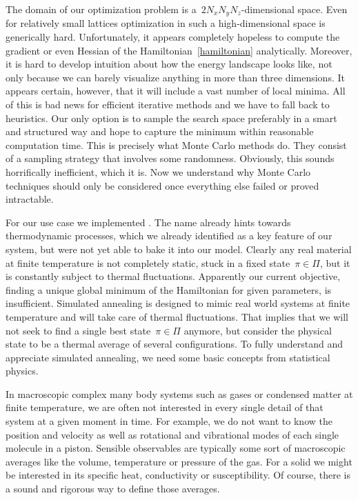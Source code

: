 The domain of our optimization problem is a~$2 N_x N_y N_z$-dimensional space.
Even for relatively small lattices optimization in such a high-dimensional space
is generically hard. Unfortunately, it appears completely hopeless to compute
the gradient or even Hessian of the Hamiltonian~\eqref{hamiltonian}
analytically. Moreover, it is hard to develop intuition about how the energy
landscape looks like, not only because we can barely visualize anything in more
than three dimensions. It appears certain, however, that it will include a vast
number of local minima. All of this is bad news for efficient iterative methods
and we have to fall back to heuristics. Our only option is to sample the search
space preferably in a smart and structured way and hope to capture the minimum
within reasonable computation time. This is precisely what Monte Carlo methods
do. They consist of a sampling strategy that involves some randomness.
Obviously, this sounds horrifically inefficient, which it is. Now we understand
why Monte Carlo techniques should only be considered once everything else failed
or proved intractable.

For our use case we implemented . The name already
hints towards thermodynamic processes, which we already identified as a key
feature of our system, but were not yet able to bake it into our model. Clearly
any real material at finite temperature is not completely static, \ie{} stuck in
a fixed state~$\pi \in \Pi$, but it is constantly subject to thermal
fluctuations. Apparently our current objective, finding a unique global minimum
of the Hamiltonian for given parameters, is insufficient. Simulated annealing is
designed to mimic real world systems at finite temperature and will take care of
thermal fluctuations. That implies that we will not seek to find a single best
state~$\pi \in \Pi$ anymore, but consider the physical state to be a thermal
average of several configurations. To fully understand and appreciate simulated
annealing, we need some basic concepts from statistical physics.

In macroscopic complex many body systems such as gases or condensed matter at
finite temperature, we are often not interested in every single detail of that
system at a given moment in time.  For example, we do not want to know the
position and velocity as well as rotational and vibrational modes of each single
molecule in a piston. Sensible observables are typically some sort of
macroscopic averages like the volume, temperature or pressure of the gas. For a
solid we might be interested in its specific heat, conductivity or
susceptibility. Of course, there is a sound and rigorous way to define those
averages.

